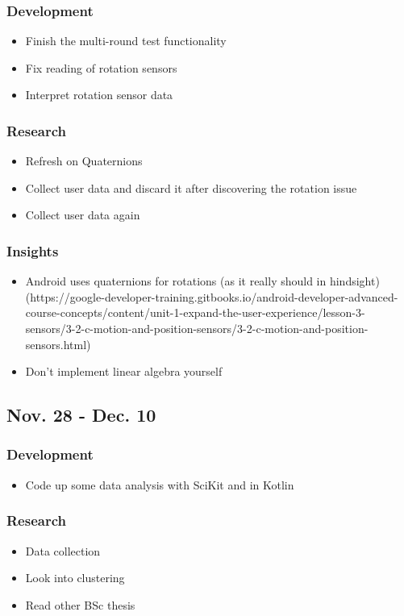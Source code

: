 \documentclass{article}
\begin{document}
\subsubsection{Development}
\begin{itemize}
    \item Finish the multi-round test functionality
    \item Fix reading of rotation sensors
    \item Interpret rotation sensor data
\end{itemize}
\subsubsection{Research}
\begin{itemize}
    \item Refresh on Quaternions
    \item Collect user data and discard it after discovering the rotation issue
    \item Collect user data again
\end{itemize}
\subsubsection{Insights}
\begin{itemize}
    \item Android uses quaternions for rotations (as it really should in hindsight) (https://google-developer-training.gitbooks.io/android-developer-advanced-course-concepts/content/unit-1-expand-the-user-experience/lesson-3-sensors/3-2-c-motion-and-position-sensors/3-2-c-motion-and-position-sensors.html)
    \item Don't implement linear algebra yourself
\end{itemize}
\subsection{Nov. 28 - Dec. 10}
\subsubsection{Development}
\begin{itemize}
    \item Code up some data analysis with SciKit and in Kotlin
\end{itemize}
\subsubsection{Research}
\begin{itemize}
    \item Data collection
    \item Look into clustering
    \item Read other BSc thesis
\end{itemize}
\end{document}
